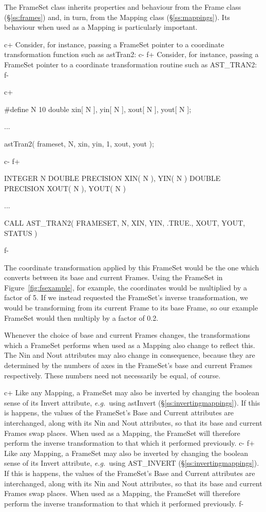 \documentclass[twoside,11pt]{starlink}
\providecommand{\secref}[1]{\S\ref{#1}}
\begin{document}
{The FrameSet class inherits properties and behaviour from the Frame
class (\secref{ss:frames}) and, in turn, from the Mapping class
(\secref{ss:mappings}). Its behaviour when used as a Mapping is
particularly important.

c+
Consider, for instance, passing a FrameSet pointer to a coordinate
transformation function such as astTran2:
c-
f+
Consider, for instance, passing a FrameSet pointer to a coordinate
transformation routine such as AST\_TRAN2:
f-

c+
\small
\begin{terminalv}
#define N 10
double xin[ N ], yin[ N ], xout[ N ], yout[ N ];

...

astTran2( frameset, N, xin, yin, 1, xout, yout );
\end{terminalv}
\normalsize
c-
f+
\small
\begin{terminalv}
      INTEGER N
      DOUBLE PRECISION XIN( N ), YIN( N )
      DOUBLE PRECISION XOUT( N ), YOUT( N )

      ...

      CALL AST_TRAN2( FRAMESET, N, XIN, YIN, .TRUE., XOUT, YOUT, STATUS )
\end{terminalv}
\normalsize
f-

The coordinate transformation applied by this FrameSet would be the
one which converts between its base and current Frames. Using the
FrameSet in Figure~\ref{fig:fsexample}, for example, the coordinates
would be multiplied by a factor of 5.  If we instead requested the
FrameSet's inverse transformation, we would be transforming from its
current Frame to its base Frame, so our example FrameSet would then
multiply by a factor of 0.2.

Whenever the choice of base and current Frames changes, the
transformations which a FrameSet performs when used as a Mapping also
change to reflect this. The Nin and Nout attributes may also change in
consequence, because they are determined by the numbers of axes in the
FrameSet's base and current Frames respectively. These numbers need
not necessarily be equal, of course.

c+
Like any Mapping, a FrameSet may also be inverted by changing the
boolean sense of its Invert attribute, \emph{e.g.}\ using astInvert
(\secref{ss:invertingmappings}). If this is happens, the values of the
FrameSet's Base and Current attributes are interchanged, along with
its Nin and Nout attributes, so that its base and current Frames swap
places. When used as a Mapping, the FrameSet will therefore perform
the inverse transformation to that which it performed previously.
c-
f+
Like any Mapping, a FrameSet may also be inverted by changing the
boolean sense of its Invert attribute, \emph{e.g.}\ using AST\_INVERT
(\secref{ss:invertingmappings}). If this is happens, the values of the
FrameSet's Base and Current attributes are interchanged, along with
its Nin and Nout attributes, so that its base and current Frames swap
places. When used as a Mapping, the FrameSet will therefore perform
the inverse transformation to that which it performed previously.
f-

}
\end{document}
